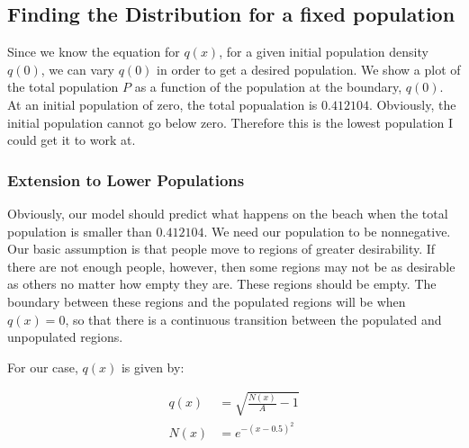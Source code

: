 \documentclass{article}
\begin{document}
\subsection{Finding the Distribution for a fixed population}

%	
%	
%	
%	

Since we know the equation for $q(x)$, for a given initial population
	density $q(0)$, we can vary $q(0)$ in order to get a desired population.
We show a plot of the total population $P$ as a function of the population
	at the boundary, $q(0)$.
At an initial population of zero, the total popualation is $0.412104$.
Obviously, the initial population cannot go below zero.
Therefore this is the lowest population I could get it to work at.

\subsubsection{Extension to Lower Populations}

Obviously, our model should predict what happens on the beach when
	the total population is smaller than $0.412104$.
We need our population to be nonnegative.
Our basic assumption is that people move to regions of greater desirability.
If there are not enough people, however, then some regions may not be
	as desirable as others no matter how empty they are.
These regions should be empty.
The boundary between these regions and the populated regions will
	be when $q(x) = 0$, so that there is a continuous transition
	between the populated and unpopulated regions.

For our case, $q(x)$ is given by:

\begin{align}
	q(x) & = \sqrt{ \frac{N(x)}{A} - 1} \nonumber \\
	N(x) & = e^{-(x - 0.5)^2} \nonumber
\end{align}
\end{document}
